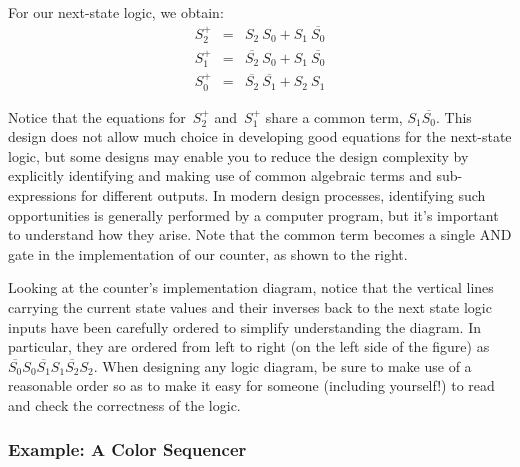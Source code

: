 For our next-state logic, we obtain:
\begin{eqnarray*}
S_2^+ &=& S_2~S_0 + S_1~\overline{\mbox{$S_0$}} \\
S_1^+ &=& \overline{\mbox{$S_2$}}~S_0 + S_1~\overline{\mbox{$S_0$}} \\
S_0^+ &=& \overline{\mbox{$S_2$}}~\overline{\mbox{$S_1$}} + S_2~S_1
\end{eqnarray*}

\begin{minipage}{3.25in}
Notice that the equations for~$S_2^+$ and~$S_1^+$ share a common term,
$S_1\overline{\mbox{$S_0$}}$.
%
This design does not allow much choice in developing good equations for
the next-state logic, but some designs may enable you to reduce 
the design complexity by explicitly identifying and making use of 
common algebraic terms and sub-expressions for different outputs.
In modern design processes, identifying such opportunities is generally
performed by a computer program, but it's important to understand
how they arise.  Note that the common term becomes a single AND gate
in the implementation of our counter, as shown to the right.\mpline

Looking at the counter's implementation diagram, notice that the vertical
lines carrying the current state values and their inverses back to the
next state
logic inputs have been carefully ordered to simplify
understanding the diagram.  In particular, they are ordered from
left to right (on the left side of the figure) as 
$\overline{\mbox{$S_0$}}S_0\overline{\mbox{$S_1$}}S_1\overline{\mbox{$S_2$}}S_2$.
When designing any logic diagram, be sure to make use of a reasonable
order so as to make it easy for someone (including yourself!) to read 
and check the correctness of the logic.
\end{minipage}\hspace{.25in}%
\begin{minipage}{3in}
\vspace{12pt}
\end{minipage}\vspace{12pt}


\subsubsection{Example: A Color Sequencer}

